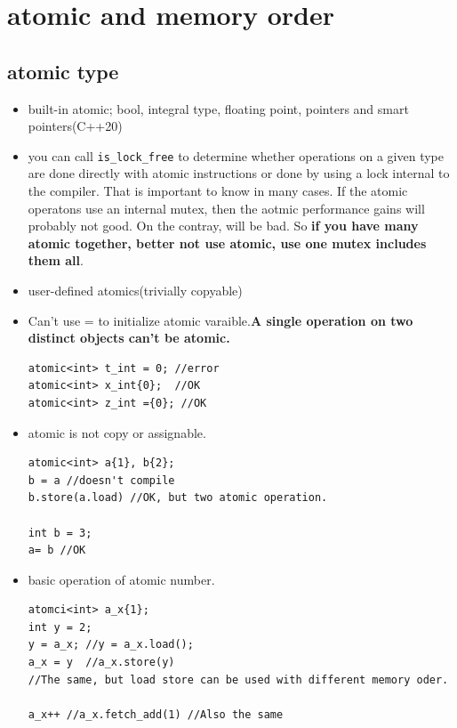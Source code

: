 \documentclass[a4paper,11pt,twoside]{book}
\begin{document}
\section{atomic and memory order}
\subsection{atomic type}
\begin{itemize}

	\item built-in atomic; bool, integral type, floating point, pointers and smart pointers(C++20)

	\item you can call \texttt{is\_lock\_free} to determine whether operations on a given type are done directly with atomic instructions or done by using a lock internal to the compiler. That is important to know in many cases. If the atomic operatons use an internal mutex, then the aotmic performance gains will probably not good. On the contray, will be bad. So \textbf{if you have many atomic together, better not use atomic, use one mutex includes them all}.
	
	\item user-defined atomics(trivially copyable)

	\item Can't use = to initialize atomic varaible.\textbf{A single operation on two distinct objects can't be atomic.}

\begin{lstlisting}[numbers=none]
atomic<int> t_int = 0; //error
atomic<int> x_int{0};  //OK
atomic<int> z_int ={0}; //OK
\end{lstlisting}	

	\item atomic is not copy or assignable.
\begin{lstlisting}[numbers=none]
atomic<int> a{1}, b{2};
b = a //doesn't compile
b.store(a.load) //OK, but two atomic operation.

int b = 3;
a= b //OK	
\end{lstlisting}	

	\item basic operation of atomic number. 
\begin{lstlisting}[numbers=none]
atomci<int> a_x{1};
int y = 2;
y = a_x; //y = a_x.load();
a_x = y  //a_x.store(y) 
//The same, but load store can be used with different memory oder.

a_x++ //a_x.fetch_add(1) //Also the same
\end{lstlisting}	


\end{itemize}
\end{document}
